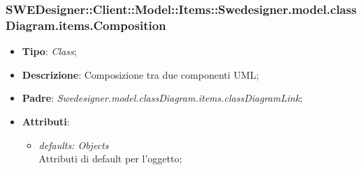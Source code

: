 \documentclass[../DefinizioneDiProdotto.tex]{subfiles}
\begin{document}
			\subsubsection{SWEDesigner::Client::Model::Items::Swedesigner.model.classDiagram.items.Composition}
			\hypertarget{SWEDesigner::Client::Model::Items::Swedesigner.model.classDiagram.items.Composition}{}
			\begin{itemize}
				\item \textbf{Tipo}: \emph{Class};
				\item \textbf{Descrizione}: Composizione tra due componenti UML;
				\item \textbf{Padre}: \emph{Swedesigner.model.classDiagram.items.classDiagramLink};
				\item \textbf{Attributi}:
				\begin{itemize}
					\item \emph{defaults: Objects}\\
					Attributi di default per l'oggetto;
				\end{itemize}
			\end{itemize}
\end{document}
